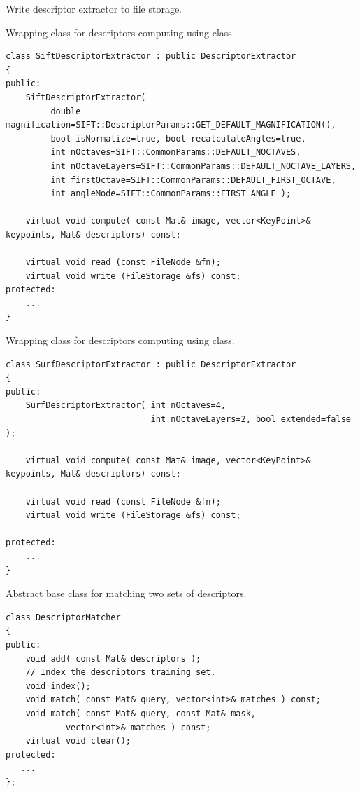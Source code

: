 Write descriptor extractor to file storage.


\begin{description}
\end{description}

Wrapping class for descriptors computing using  class.

\begin{lstlisting}
class SiftDescriptorExtractor : public DescriptorExtractor
{
public:
    SiftDescriptorExtractor( 
	     double magnification=SIFT::DescriptorParams::GET_DEFAULT_MAGNIFICATION(),
	     bool isNormalize=true, bool recalculateAngles=true,
	     int nOctaves=SIFT::CommonParams::DEFAULT_NOCTAVES,
	     int nOctaveLayers=SIFT::CommonParams::DEFAULT_NOCTAVE_LAYERS,
	     int firstOctave=SIFT::CommonParams::DEFAULT_FIRST_OCTAVE,
	     int angleMode=SIFT::CommonParams::FIRST_ANGLE );

    virtual void compute( const Mat& image, vector<KeyPoint>& keypoints, Mat& descriptors) const;

    virtual void read (const FileNode &fn);
    virtual void write (FileStorage &fs) const;
protected:
    ...
}
\end{lstlisting}

Wrapping class for descriptors computing using  class.

\begin{lstlisting}
class SurfDescriptorExtractor : public DescriptorExtractor
{
public:
    SurfDescriptorExtractor( int nOctaves=4,
                             int nOctaveLayers=2, bool extended=false );

    virtual void compute( const Mat& image, vector<KeyPoint>& keypoints, Mat& descriptors) const;

    virtual void read (const FileNode &fn);
    virtual void write (FileStorage &fs) const;
   
protected:
    ...
}
\end{lstlisting}

Abstract base class for matching two sets of descriptors.

\begin{lstlisting}
class DescriptorMatcher
{
public:
    void add( const Mat& descriptors );
    // Index the descriptors training set.
    void index();
    void match( const Mat& query, vector<int>& matches ) const;
    void match( const Mat& query, const Mat& mask,
	        vector<int>& matches ) const;
    virtual void clear();
protected:
   ...
};
\end{lstlisting} 

